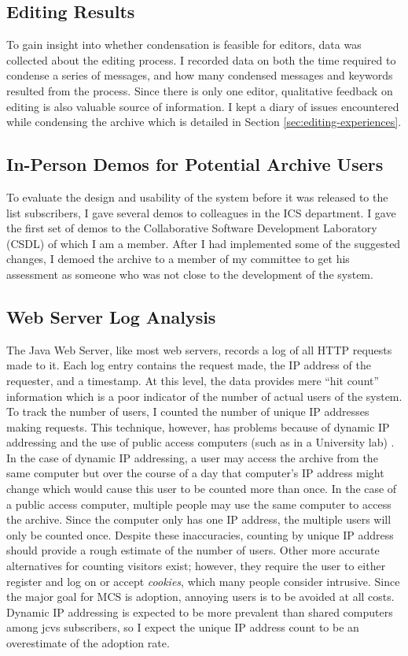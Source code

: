 \subsection{Editing Results}
To gain insight into whether condensation is feasible for editors, data was
collected about the editing process. I recorded data on both the time required
to condense a series of messages, and how many condensed messages and keywords
resulted from the process. Since there is only one editor, qualitative feedback
on editing is also valuable source of information. I kept a diary of issues
encountered while condensing the archive which is detailed in Section
\ref{sec:editing-experiences}.

\subsection{In-Person Demos for Potential Archive Users}
To evaluate the design and usability of the system before it was released to
the list subscribers, I gave several demos to colleagues in the ICS department.
I gave the first set of demos to the Collaborative Software Development
Laboratory (CSDL) of which I am a member. After I had implemented some of the
suggested changes, I demoed the archive to a member of my committee to get his
assessment as someone who was not close to the development of the system.

\subsection{Web Server Log Analysis}
\label{sec:log-analysis-design}
The Java Web Server, like most web servers, records a log of all HTTP
\cite{rfc-http} requests made to it. Each log entry contains the request made,
the IP address of the requester, and a timestamp. At this level, the data
provides mere ``hit count'' information which is a poor indicator of the number
of actual users of the system. To track the number of users, I counted the
number of unique IP addresses making requests. This technique, however, has
problems because of dynamic IP addressing and the use of public access
computers (such as in a University lab) \cite{webmonkey-ebusiness1}. In the
case of dynamic IP addressing, a user may access the archive from the same
computer but over the course of a day that computer's IP address might change
which would cause this user to be counted more than once. In the case of a
public access computer, multiple people may use the same computer to access the
archive. Since the computer only has one IP address, the multiple users will
only be counted once. Despite these inaccuracies, counting by unique IP address
should provide a rough estimate of the number of users. Other more accurate
alternatives for counting visitors exist; however, they require the user to
either register and log on or accept {\it cookies}, which many people consider
intrusive. Since the major goal for MCS is adoption, annoying users is to be
avoided at all costs. Dynamic IP addressing is expected to be more prevalent
than shared computers among jcvs subscribers, so I expect the unique IP address
count to be an overestimate of the adoption rate.

